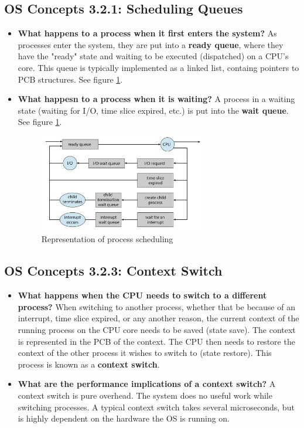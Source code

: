 \documentclass[12pt]{article}
\begin{document}
\subsection*{OS Concepts 3.2.1: Scheduling Queues}

\begin{itemize}
    \item \textbf{What happens to a process when it first enters the system?} As processes enter the system, they are put into a \textbf{ready queue}, where they have the "ready" state and waiting to be executed (dispatched) on a CPU's core. This queue is typically implemented as a linked list, containg pointers to PCB structures. See figure \ref{fig:queueing-diagram}.
    \item \textbf{What happesn to a process when it is waiting?} A process in a waiting state (waiting for I/O, time slice expired, etc.) is put into the \textbf{wait queue}. See figure \ref{fig:queueing-diagram}.
    \begin{figure}[ht]
        \centering
        \includegraphics[width=0.7\textwidth]{figures/queueing-diagram.jpg}
        \caption{Representation of process scheduling}
        \label{fig:queueing-diagram}
    \end{figure}
\end{itemize}

\subsection*{OS Concepts 3.2.3: Context Switch}

\begin{itemize}
    \item \textbf{What happens when the CPU needs to switch to a different process?} When switching to another process, whether that be because of an interrupt, time slice expired, or any another reason, the current context of the running process on the CPU core needs to be saved (state save). The context is represented in the PCB of the context. The CPU then needs to restore the context of the other process it wishes to switch to (state restore). This process is known as a \textbf{context switch}.
    \item \textbf{What are the performance implications of a context switch?} A context switch is pure overhead. The system does no useful work while switching processes. A typical context switch takes several microseconds, but is highly dependent on the hardware the OS is running on.
\end{itemize}
\end{document}
